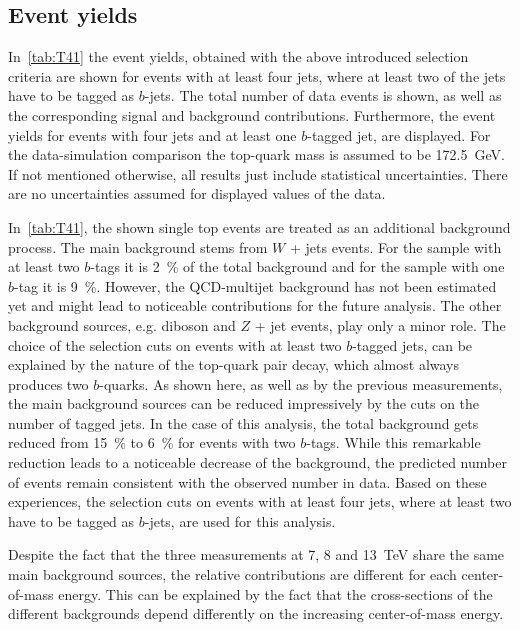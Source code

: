 \subsection{Event yields}

In~\cref{tab:T41} the event yields, obtained with the above introduced selection criteria are shown for events with at least four jets, where at least two of the jets have to be tagged as $b$-jets. The total number of data events is shown, as well as the corresponding signal and background contributions. Furthermore, the event yields for events with four jets and at least one $b$-tagged jet, are displayed. 
For the data-simulation comparison the top-quark mass is assumed to be 172.5~GeV. If not mentioned otherwise, all results just include statistical uncertainties. There are no uncertainties assumed for displayed values of the data. 

In~\cref{tab:T41}, the shown single top events are treated as an additional background process.
The main background stems from $W$ + jets events. For the sample with at least two $b$-tags it is  2~\% of the total background and for the sample with one $b$-tag it is 9~\%. However, the QCD-multijet background has not been estimated yet and might lead to noticeable contributions for the future analysis. The other background sources, e.g.  diboson  and $Z$ + jet events, play only a minor role. 
The choice of the selection cuts on events with at least two $b$-tagged jets, can be explained by the nature of the top-quark pair decay, which almost always produces two $b$-quarks.  As shown here, as well as by the previous measurements, the main background sources can be reduced impressively by the cuts on the number of tagged jets. In the  case of this analysis, the total background gets reduced from  15~\% to 6~\% for events with two  $b$-tags. While this remarkable reduction leads to a noticeable decrease of the background, the predicted number of events remain consistent with the observed number in data. Based on these experiences, the selection cuts on events with at least four jets, where at least two have to be tagged as $b$-jets, are used for this analysis.

Despite the fact that the three measurements at 7, 8 and 13~TeV share the same main background sources, the relative contributions are different for each center-of-mass energy. This can be explained by the fact that the cross-sections of the different backgrounds depend differently on the increasing center-of-mass energy.
\vspace{0.5cm}

\vspace{1.0cm}

